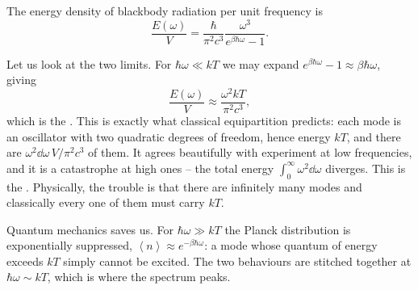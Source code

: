 \documentclass[a4paper]{scrartcl}
\newcommand{\avg}[1]{\left\langle #1 \right\rangle}
\begin{document}
\begin{proposition}
	The energy density of blackbody radiation per unit frequency is
	$$
	\frac{E(\omega)}{V} = \frac{\hbar}{\pi^2 c^3}\frac{\omega^3}{e^{\beta\hbar\omega}-1}.
	$$
\end{proposition}

Let us look at the two limits. For $\hbar\omega \ll kT$ we may expand $e^{\beta\hbar\omega} - 1 \approx \beta\hbar\omega$, giving
$$
\frac{E(\omega)}{V} \approx \frac{\omega^2 kT}{\pi^2 c^3},
$$
which is the . This is exactly what classical equipartition predicts: each mode is an oscillator with two quadratic degrees of freedom, hence energy $kT$, and there are $\omega^2 \dd\omega \,V/\pi^2c^3$ of them. It agrees beautifully with experiment at low frequencies, and it is a catastrophe at high ones -- the total energy $\int_0^\infty \omega^2 \dd\omega$ diverges. This is the . Physically, the trouble is that there are infinitely many modes and classically every one of them must carry $kT$.

Quantum mechanics saves us. For $\hbar\omega \gg kT$ the Planck distribution is exponentially suppressed, $\avg n \approx e^{-\beta\hbar\omega}$: a mode whose quantum of energy exceeds $kT$ simply cannot be excited. The two behaviours are stitched together at $\hbar\omega \sim kT$, which is where the spectrum peaks.
\end{document}
